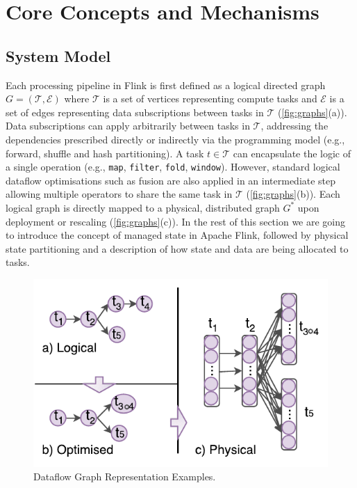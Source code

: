 
\section{Core Concepts and Mechanisms}
\label{sec:core}

\subsection{System Model}

Each processing pipeline in Flink is first defined as a logical directed graph $G = (\mathcal{T}, \mathcal{E})$ where $\mathcal{T}$ is a set of vertices representing compute tasks and $\mathcal{E}$ is a set of edges representing data subscriptions between tasks in $\mathcal{T}$ (\autoref{fig:graphs}(a)). Data subscriptions can apply arbitrarily between tasks in $\mathcal{T}$, addressing the dependencies prescribed directly or indirectly via the programming model (e.g., forward, shuffle and hash partitioning). A task $t \in \mathcal{T}$ can encapsulate the logic of a single operation (e.g., \texttt{map}, \texttt{filter}, \texttt{fold}, \texttt{window}). However, standard logical dataflow optimisations  such as fusion \cite{hirzel2014catalog,chambers2010flumejava} are also applied in an intermediate step allowing multiple operators to share the same task in $\mathcal{T}$ (\autoref{fig:graphs}(b)). Each logical graph is directly mapped to a physical, distributed graph $G^*$ upon deployment or rescaling (\autoref{fig:graphs}(c)). In the rest of this section we are going to introduce the concept of managed state in Apache Flink, followed by physical state partitioning and a description of how state and data are being allocated to tasks.

\begin{figure}[t]
\centering
\includegraphics[width=\textwidth / 2]{figures/graphs.pdf}
\vspace*{-5mm}
\caption{Dataflow Graph Representation Examples.} 
\label{fig:graphs}
\vspace{-4mm}
\end{figure}

